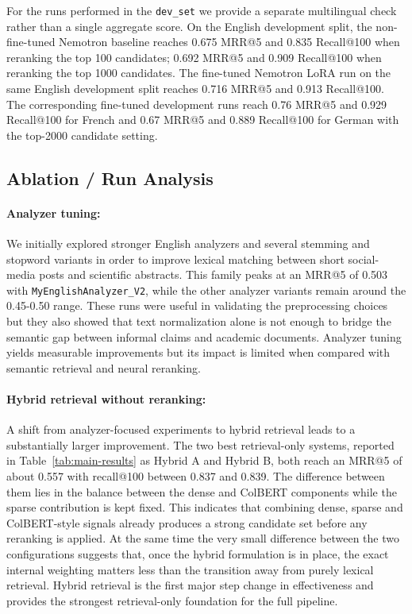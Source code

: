 For the runs performed in the \texttt{dev\_set} we provide a separate multilingual check rather than a single aggregate score. On the English development split, the non-fine-tuned Nemotron baseline reaches 0.675 MRR@5 and 0.835 Recall@100 when reranking the top 100 candidates; 0.692 MRR@5 and 0.909 Recall@100 when reranking the top 1000 candidates. The fine-tuned Nemotron LoRA run on the same English development split reaches 0.716 MRR@5 and 0.913 Recall@100. The corresponding fine-tuned development runs reach 0.76 MRR@5 and 0.929 Recall@100 for French and 0.67 MRR@5 and 0.889 Recall@100 for German with the top-2000 candidate setting.

\subsection{Ablation / Run Analysis}

\paragraph{Analyzer tuning:}
We initially explored stronger English analyzers and several stemming and stopword variants in order to improve lexical matching between short social-media posts and scientific abstracts. This family peaks at an MRR@5 of 0.503 with \texttt{MyEnglishAnalyzer\_V2}, while the other analyzer variants remain around the 0.45-0.50 range. These runs were useful in validating the preprocessing choices but they also showed that text normalization alone is not enough to bridge the semantic gap between informal claims and academic documents. Analyzer tuning yields measurable improvements but its impact is limited when compared with semantic retrieval and neural reranking.

\paragraph{Hybrid retrieval without reranking:}
A shift from analyzer-focused experiments to hybrid retrieval leads to a substantially larger improvement. The two best retrieval-only systems, reported in Table~\ref{tab:main-results} as Hybrid A and Hybrid B, both reach an MRR@5 of about 0.557 with recall@100 between 0.837 and 0.839. The difference between them lies in the balance between the dense and ColBERT components while the sparse contribution is kept fixed. This indicates that combining dense, sparse and ColBERT-style signals already produces a strong candidate set before any reranking is applied. At the same time the very small difference between the two configurations suggests that, once the hybrid formulation is in place, the exact internal weighting matters less than the transition away from purely lexical retrieval. Hybrid retrieval is the first major step change in effectiveness and provides the strongest retrieval-only foundation for the full pipeline.

